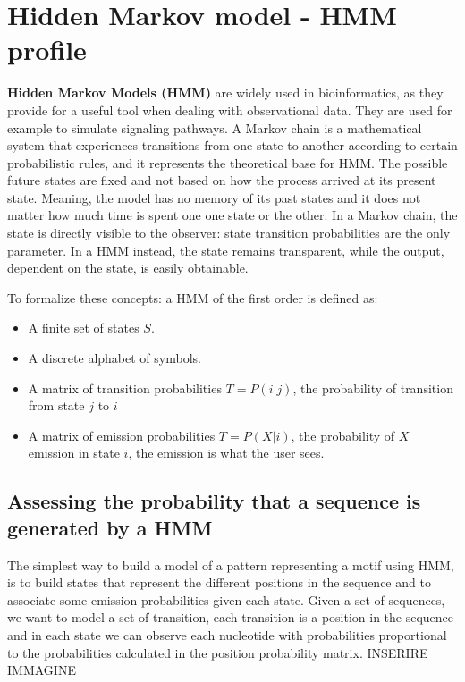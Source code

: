 	\section{Hidden Markov model - HMM profile}
	\textbf{Hidden Markov Models (HMM)} are widely used in bioinformatics, as they provide for a useful tool when dealing with observational data. They are used for example to simulate signaling pathways. 
	A Markov chain is a mathematical system that experiences transitions from one state to another according to certain probabilistic rules, and it represents the theoretical base for HMM.
	The possible future states are fixed and not based on how the process arrived at its present state.
	Meaning, the model has no memory of its past states and it does not matter how much time is spent one one state or the other. 
	In a Markov chain, the state is directly visible to the observer: state transition probabilities are the only parameter.
	In a HMM instead, the state remains transparent, while the output, dependent on the state, is easily obtainable.
	
	To formalize these concepts: a HMM of the first order is defined as:
	\begin{multicols}{2}
		\begin{itemize}
			\item A finite set of states $S$.
			\item A discrete alphabet of symbols.
			\item A matrix of transition probabilities $T = P(i|j)$, the probability of transition from state $j$ to $i$
			\item A matrix of emission probabilities $T = P(X|i)$, the probability of $X$ emission in state $i$, the emission is what the user sees.
		\end{itemize}
	\end{multicols}

		\subsection{Assessing the probability that a sequence is generated by a HMM}
		The simplest way to build a model of a pattern representing a motif using HMM, is to build states that represent the different positions in the sequence and to associate some emission probabilities given each state. 
		Given a set of sequences, we want to model a set of transition, each transition is a position in the sequence and in each state we can observe each nucleotide with probabilities proportional to the probabilities calculated in the position probability matrix.
		INSERIRE IMMAGINE

